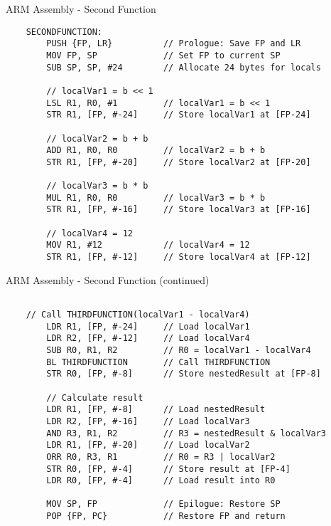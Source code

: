 \documentclass[aspectratio=169]{beamer}
\begin{document}
\begin{frame}[fragile]{ARM Assembly - Second Function}
    \begin{verbatim}
    SECONDFUNCTION:
        PUSH {FP, LR}          // Prologue: Save FP and LR
        MOV FP, SP             // Set FP to current SP
        SUB SP, SP, #24        // Allocate 24 bytes for locals
    
        // localVar1 = b << 1
        LSL R1, R0, #1         // localVar1 = b << 1
        STR R1, [FP, #-24]     // Store localVar1 at [FP-24]
    
        // localVar2 = b + b
        ADD R1, R0, R0         // localVar2 = b + b
        STR R1, [FP, #-20]     // Store localVar2 at [FP-20]
    
        // localVar3 = b * b
        MUL R1, R0, R0         // localVar3 = b * b
        STR R1, [FP, #-16]     // Store localVar3 at [FP-16]
    
        // localVar4 = 12
        MOV R1, #12            // localVar4 = 12
        STR R1, [FP, #-12]     // Store localVar4 at [FP-12]
\end{verbatim}
\end{frame}

\begin{frame}[fragile]{ARM Assembly - Second Function (continued)}
    \begin{verbatim}

    // Call THIRDFUNCTION(localVar1 - localVar4)
        LDR R1, [FP, #-24]     // Load localVar1
        LDR R2, [FP, #-12]     // Load localVar4
        SUB R0, R1, R2         // R0 = localVar1 - localVar4
        BL THIRDFUNCTION       // Call THIRDFUNCTION
        STR R0, [FP, #-8]      // Store nestedResult at [FP-8]
    
        // Calculate result
        LDR R1, [FP, #-8]      // Load nestedResult
        LDR R2, [FP, #-16]     // Load localVar3
        AND R3, R1, R2         // R3 = nestedResult & localVar3
        LDR R1, [FP, #-20]     // Load localVar2
        ORR R0, R3, R1         // R0 = R3 | localVar2
        STR R0, [FP, #-4]      // Store result at [FP-4]
        LDR R0, [FP, #-4]      // Load result into R0
    
        MOV SP, FP             // Epilogue: Restore SP
        POP {FP, PC}           // Restore FP and return
    \end{verbatim}
\end{frame}
\end{document}
